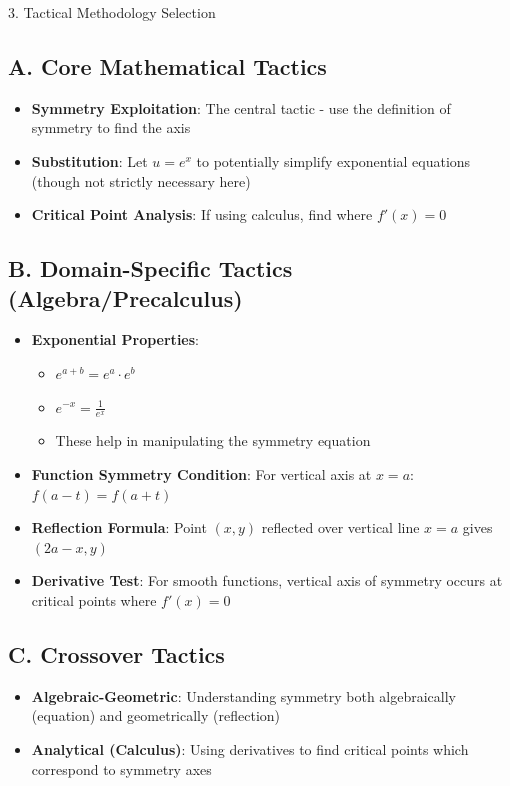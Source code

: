\documentclass[12pt]{article}
\begin{document}
\begin{tacticsbox}{3. Tactical Methodology Selection}

\subsection*{A. Core Mathematical Tactics}
\begin{itemize}[leftmargin=*]
    \item \textbf{Symmetry Exploitation}: The central tactic - use the definition of symmetry to find the axis
    
    \item \textbf{Substitution}: Let $u = e^x$ to potentially simplify exponential equations (though not strictly necessary here)
    
    \item \textbf{Critical Point Analysis}: If using calculus, find where $f'(x) = 0$
\end{itemize}

\subsection*{B. Domain-Specific Tactics (Algebra/Precalculus)}
\begin{itemize}[leftmargin=*]
    \item \textbf{Exponential Properties}:
    \begin{itemize}
        \item $e^{a+b} = e^a \cdot e^b$
        \item $e^{-x} = \frac{1}{e^x}$
        \item These help in manipulating the symmetry equation
    \end{itemize}
    
    \item \textbf{Function Symmetry Condition}: For vertical axis at $x = a$: $f(a-t) = f(a+t)$
    
    \item \textbf{Reflection Formula}: Point $(x, y)$ reflected over vertical line $x = a$ gives $(2a - x, y)$
    
    \item \textbf{Derivative Test}: For smooth functions, vertical axis of symmetry occurs at critical points where $f'(x) = 0$
\end{itemize}

\subsection*{C. Crossover Tactics}
\begin{itemize}[leftmargin=*]
    \item \textbf{Algebraic-Geometric}: Understanding symmetry both algebraically (equation) and geometrically (reflection)
    
    \item \textbf{Analytical (Calculus)}: Using derivatives to find critical points which correspond to symmetry axes
\end{itemize}

\end{tacticsbox}
\end{document}
